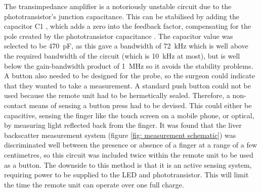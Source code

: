 
The transimpedance amplifier is a notoriously unstable circuit due to the phototransistor's junction capacitance. This can be stabilised by adding the capacitor C1 \cite{tia_stability}, which adds a zero into the feedback factor, compensating for the pole created by the phototransistor capacitance \cite{tia_stability}. The capacitor value was selected to be \SI{470}{\pico\farad}, as this gave a bandwidth of \SI{72}{\kilo\hertz} which is well above the required bandwidth of the circuit (which is \SI{10}{\kilo\hertz} at most), but is well below the gain-bandwidth product of \SI{1}{\mega\hertz} so it avoids the stability problems.\\

A button also needed to be designed for the probe, so the surgeon could indicate that they wanted to take a measurement. A standard push button could not be used because the remote unit had to be hermetically sealed. Therefore, a non-contact means of sensing a button press had to be devised. This could either be capacitive, sensing the finger like the touch screen on a mobile phone, or optical, by measuring light reflected back from the finger. It was found that the liver backscatter measurement system (figure \ref{fig: measurement schematic}) was discriminated well between the presence or absence of a finger at a range of a few centimetres, so this circuit was included twice within the remote unit to be used as a button. The downside to this method is that it is an active sensing system, requiring power to be supplied to the LED and phototransistor. This will limit the time the remote unit can operate over one full charge. \\



